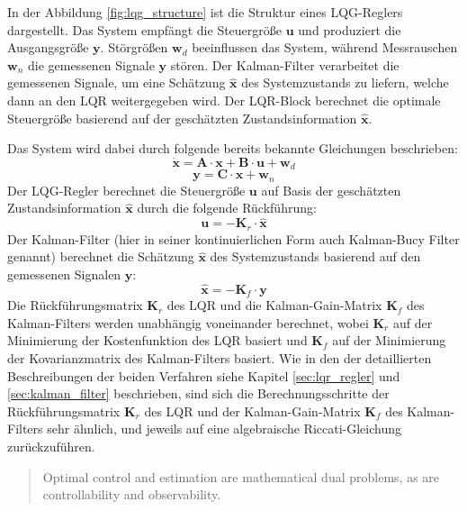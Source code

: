 In der Abbildung \ref{fig:lqg_structure} ist die Struktur eines LQG-Reglers dargestellt. Das System empfängt die Steuergröße $\mathbf{u}$ und produziert die Ausgangsgröße $\mathbf{y}$. Störgrößen $\mathbf{w}_d$ beeinflussen das System, während Messrauschen $\mathbf{w}_n$ die gemessenen Signale $\mathbf{y}$ stören. Der Kalman-Filter verarbeitet die gemessenen Signale, um eine Schätzung $\hat{\mathbf{x}}$ des Systemzustands zu liefern, welche dann an den LQR weitergegeben wird. Der LQR-Block berechnet die optimale Steuergröße basierend auf der geschätzten Zustandsinformation $\hat{\mathbf{x}}$. 

Das System wird dabei durch folgende bereits bekannte Gleichungen beschrieben:
\begin{equation}
\dot{\mathbf{x}} = \mathbf{A} \cdot \mathbf{x} + \mathbf{B} \cdot \mathbf{u} + \mathbf{w}_d
\end{equation}
\begin{equation}
\mathbf{y} = \mathbf{C} \cdot \mathbf{x} + \mathbf{w}_n
\end{equation}
Der LQG-Regler berechnet die Steuergröße $\mathbf{u}$ auf Basis der geschätzten Zustandsinformation $\hat{\mathbf{x}}$ durch die folgende Rückführung:
\begin{equation}\mathbf{u} = -\mathbf{K}_r \cdot \hat{\mathbf{x}}
\end{equation}
Der Kalman-Filter (hier in seiner kontinuierlichen Form auch Kalman-Bucy Filter genannt) berechnet die Schätzung $\hat{\mathbf{x}}$ des Systemzustands basierend auf den gemessenen Signalen $\mathbf{y}$:
\begin{equation}\hat{\mathbf{x}} = -\mathbf{K}_f \cdot \mathbf{y}\end{equation}
Die Rückführungsmatrix $\mathbf{K}_r$ des LQR und die Kalman-Gain-Matrix $\mathbf{K}_f$ des Kalman-Filters werden unabhängig voneinander berechnet, wobei $\mathbf{K}_r$ auf der Minimierung der Kostenfunktion des LQR basiert und $\mathbf{K}_f$ auf der Minimierung der Kovarianzmatrix des Kalman-Filters basiert.
Wie in den der detaillierten Beschreibungen der beiden Verfahren siehe Kapitel \ref{sec:lqr_regler} und \ref{sec:kalman_filter} beschrieben, sind sich die Berechnungsschritte der Rückführungsmatrix $\mathbf{K}_r$ des LQR und der Kalman-Gain-Matrix $\mathbf{K}_f$ des Kalman-Filters sehr ähnlich, und jeweils auf eine algebraische Riccati-Gleichung zurückzuführen. 
\begin{quote}
Optimal control and estimation are mathematical dual problems, as are controllability and observability.
 \parencite{DataDrivenScience}
\end{quote}
